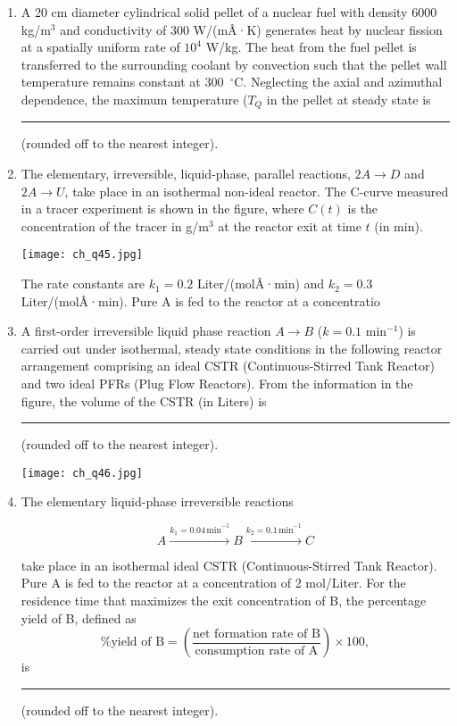 \documentclass[12pt]{article}
\begin{document}
\begin{enumerate}[label=Q.\arabic*]
		\item A 20 cm diameter cylindrical solid pellet of a nuclear fuel with density 6000 kg/m$^3$ and conductivity of 300 W/(mÂ·K) generates heat by nuclear fission at a spatially uniform rate of $10^4$ W/kg. The heat from the fuel pellet is transferred to the surrounding coolant by convection such that the pellet wall temperature remains constant at 300~$^\circ$C. Neglecting the axial and azimuthal dependence, the maximum temperature ($T_Q$ in the pellet at steady state is \rule{3cm}{0.15mm} (rounded off to the nearest integer).

		\item The elementary, irreversible, liquid-phase, parallel reactions, $2A \rightarrow D$ and $2A \rightarrow U$, take place in an isothermal non-ideal reactor. The C-curve measured in a tracer experiment is shown in the figure, where $C(t)$ is the concentration of the tracer in g/m$^3$ at the reactor exit at time $t$ (in min).

			\begin{center}{
					\texttt{[image: ch\_q45.jpg]}
			}\end{center}

			The rate constants are $k_1 = 0.2$ Liter/(molÂ·min) and $k_2 = 0.3$ Liter/(molÂ·min). Pure A is fed to the reactor at a concentratio

		\item A first-order irreversible liquid phase reaction $A \rightarrow B$ ($k = 0.1$ min$^{-1}$) is carried out under isothermal, steady state conditions in the following reactor arrangement comprising an ideal CSTR (Continuous-Stirred Tank Reactor) and two ideal PFRs (Plug Flow Reactors). From the information in the figure, the volume of the CSTR (in Liters) is \rule{3cm}{0.15mm} (rounded off to the nearest integer).

			\begin{center}{
					\texttt{[image: ch\_q46.jpg]}
			}\end{center}

		\item The elementary liquid-phase irreversible reactions

			\[ A \xrightarrow{k_1 = 0.04\,\text{min}^{-1}} B \xrightarrow{k_2 = 0.1\,\text{min}^{-1}} C \]

			take place in an isothermal ideal CSTR (Continuous-Stirred Tank Reactor). Pure A is fed to the reactor at a concentration of 2 mol/Liter. For the residence time that maximizes the exit concentration of B, the percentage yield of B, defined as \[ \text{\% yield of B} = \left( \frac{\text{net formation rate of B}}{\text{consumption rate of A}} \right) \times 100, \] is \rule{3cm}{0.15mm} (rounded off to the nearest integer).


\end{enumerate}
\end{document}
